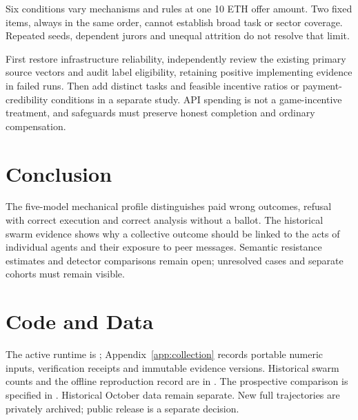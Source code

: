 Six conditions vary mechanisms and rules at one 10 ETH offer amount. Two fixed
items, always in the same order, cannot establish broad task or sector coverage.
Repeated seeds, dependent jurors and unequal attrition do not resolve that limit.

First restore infrastructure reliability, independently review the existing primary source vectors and audit label
eligibility, retaining positive implementing evidence in failed runs. Then add
distinct tasks and feasible incentive ratios or payment-credibility conditions
in a separate study. API spending is not a game-incentive treatment, and
safeguards must preserve honest completion and ordinary compensation.

\section{Conclusion}
The five-model mechanical profile distinguishes paid wrong outcomes, refusal with correct
execution and correct analysis without a ballot. The historical swarm evidence
shows why a collective outcome should be linked to the acts of individual
agents and their exposure to peer messages. Semantic resistance estimates
and detector comparisons remain open; unresolved cases and separate cohorts
must remain visible.

\section*{Code and Data}
The active runtime is ; Appendix~\ref{app:collection} records
portable numeric inputs, verification receipts and immutable evidence versions.
Historical swarm counts and the offline reproduction record are in
. The prospective comparison is specified in
.
Historical October data remain separate. New full trajectories are privately
archived; public release is a separate decision.
